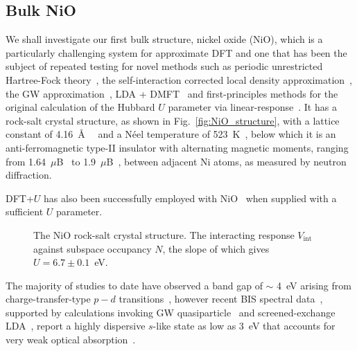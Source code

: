 \subsection{Bulk NiO}
\label{sec:NiO_calculating_u}
We shall investigate our first bulk structure, 
nickel oxide (NiO), 
which is a particularly challenging system for approximate DFT
and one that has been the subject of repeated testing 
for novel methods such as 
periodic unrestricted Hartree-Fock theory~\cite{PhysRevB.50.5041}, 
the self-interaction corrected local density
approximation~\cite{PhysRevLett.65.1148},
the GW approximation~\cite{PhysRevLett.74.3221},
LDA + DMFT~\cite{PhysRevB.74.195114} 
and first-principles methods for
the original calculation of the Hubbard $U$ parameter 
via linear-response~\cite{PhysRevB.71.035105,PhysRevB.58.1201}.
%
It has a rock-salt crystal structure, 
as shown in Fig.~\ref{fig:NiO_structure}, 
with a lattice constant of 4.16~\AA\ ~\cite{PhysRevB.57.1505} 
and a N\'eel temperature of 523~K~\cite{PhysRevB.30.4734},
below which it is an anti-ferromagnetic type-II insulator 
with alternating magnetic moments, 
ranging from 1.64~$\mu$B~\cite{alperin1962nio} 
to 1.9~$\mu$B~\cite{PhysRevB.27.6964}, 
between adjacent Ni atoms,
as measured by neutron diffraction. 

DFT+$U$ has also been successfully 
employed with NiO~\cite{PhysRevB.48.16929,PhysRevB.57.1505,PhysRevB.71.035105,PhysRevB.58.1201,PhysRevB.62.16392} 
when supplied with a sufficient $U$ parameter.


\begin{figure}[th!]
\centering
{}
\quad
%
%
\caption[NiO crystal structure and linear-response calculation]
{ 
The NiO rock-salt crystal structure.
The interacting response $V_\textrm{int}$ 
against subspace occupancy $N$, 
the slope of which gives $U=6.7\pm0.1$~eV.}
\end{figure}

The majority of studies to date 
have observed a band gap 
of $\sim$ 4~eV arising from 
charge-transfer-type $p-d$ transitions~\cite{PhysRevB.43.14674,PhysRevLett.53.2339}, 
however recent 
BIS spectral data~\cite{0953-8984-11-7-002}, 
supported by calculations invoking 
GW quasiparticle~\cite{PhysRevB.71.193102,doi:10.1080/00018739400101495} 
and screened-exchange LDA~\cite{0953-8984-25-16-165502}, 
report a highly dispersive 
$s$-like state as low as 3~eV
that accounts for very weak optical 
absorption~\cite{Hufner1992,PhysRevB.79.045118,PhysRevB.62.16392}.
%


